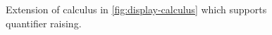 \begin{figure}
\begin{mdframed}
    \vspace*{\baselineskip}
    \begin{pfbox}
      \doubleLine{}
    \end{pfbox}
    \begin{pfbox}
      \doubleLine{}
    \end{pfbox}
    \vspace*{\baselineskip}
  \end{mdframed}
  \caption{
    Extension of calculus in \autoref{fig:display-calculus} which
    supports quantifier raising.}%
  \label{fig:extension-quantifier-raising}
\end{figure}

